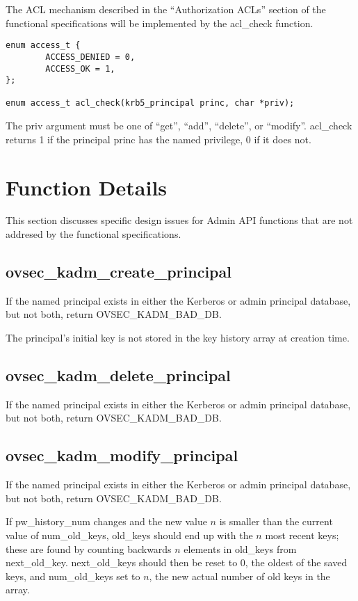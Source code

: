 The ACL mechanism described in the ``Authorization ACLs'' section of
the functional specifications will be implemented by the acl_check
function.

\begin{verbatim}
enum access_t {
        ACCESS_DENIED = 0,
        ACCESS_OK = 1,
};

enum access_t acl_check(krb5_principal princ, char *priv);
\end{verbatim}

The priv argument must be one of ``get'', ``add'', ``delete'', or
``modify''.  acl_check returns 1 if the principal princ has the named
privilege, 0 if it does not.

\section{Function Details}

This section discusses specific design issues for Admin API functions
that are not addresed by the functional specifications.

\subsection{ovsec_kadm_create_principal}

If the named principal exists in either the Kerberos or admin
principal database, but not both, return OVSEC_KADM_BAD_DB.

The principal's initial key is not stored in the key history array at
creation time.

\subsection{ovsec_kadm_delete_principal}

If the named principal exists in either the Kerberos or admin
principal database, but not both, return OVSEC_KADM_BAD_DB.

\subsection{ovsec_kadm_modify_principal}

If the named principal exists in either the Kerberos or admin
principal database, but not both, return OVSEC_KADM_BAD_DB.

If pw_history_num changes and the new value $n$ is smaller than the
current value of num_old_keys, old_keys should end up with the $n$
most recent keys; these are found by counting backwards $n$ elements
in old_keys from next_old_key.  next_old_keys should then be reset to
0, the oldest of the saved keys, and num_old_keys set to $n$, the
new actual number of old keys in the array.  

